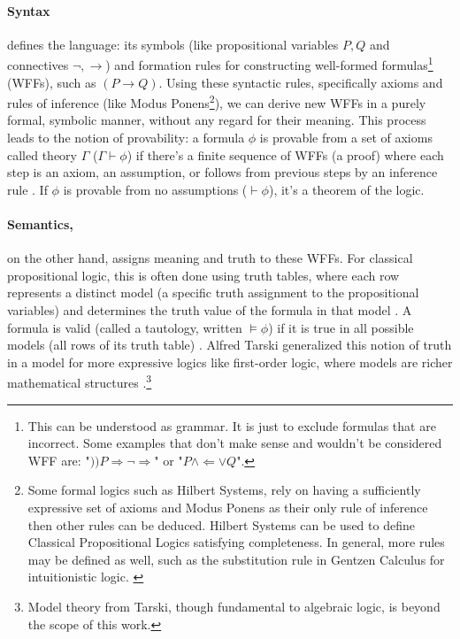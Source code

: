 \paragraph{Syntax} defines the language: its symbols (like propositional variables $P, Q$ and connectives $\neg, \rightarrow$) and formation rules for constructing well-formed formulas\footnote{This can be understood as grammar. It is just to exclude formulas that are incorrect. Some examples that don't make sense and wouldn't be considered WFF are: "$))P\Rightarrow \neg\Rightarrow $" or "$P \land \Leftarrow \lor Q$".} (WFFs), such as $(P \rightarrow Q)$. Using these syntactic rules, specifically axioms and rules of inference (like Modus Ponens\footnote{Some formal logics such as Hilbert Systems, rely on having a sufficiently expressive set of axioms and Modus Ponens as their only rule of inference then other rules can be deduced\cite[Sec.~1.2, Def.~1.2.6]{Hajek1998}. Hilbert Systems can be used to define Classical Propositional Logics satisfying completeness. In general, more rules may be defined as well, such as the substitution rule in Gentzen Calculus for intuitionistic logic. \cite[p.~39,64]{ResiduatedLattices2007}}), we can derive new WFFs in a purely formal, symbolic manner, without any regard for their meaning. This process leads to the notion of provability: a formula $\phi$ is provable from a set of axioms called theory $\Gamma$ ($\Gamma \vdash \phi$) if there's a finite sequence of WFFs (a proof) where each step is an axiom, an assumption, or follows from previous steps by an inference rule \cite[Sec.~1.2, Defs.~1.2.6, 1.2.8]{Hajek1998}. If $\phi$ is provable from no assumptions ($\vdash \phi$), it's a theorem of the logic. 

\paragraph{Semantics,} on the other hand, assigns meaning and truth to these WFFs. For classical propositional logic, this is often done using truth tables, where each row represents a distinct model (a specific truth assignment to the propositional variables) and determines the truth value of the formula in that model \cite[Sec.~1.2]{Hajek1998}. A formula is valid (called a tautology, written $\models \phi$) if it is true in all possible models (all rows of its truth table) \cite[Sec.~1.2.2]{Hajek1998}. Alfred Tarski generalized this notion of truth in a model for more expressive logics like first-order logic, where models are richer mathematical structures \cite[Sec.~1.3, Defs.~1.3.1, 1.3.8]{Hajek1998}.\footnote{Model theory from Tarski, though fundamental to algebraic logic, is beyond the scope of this work.}\\

